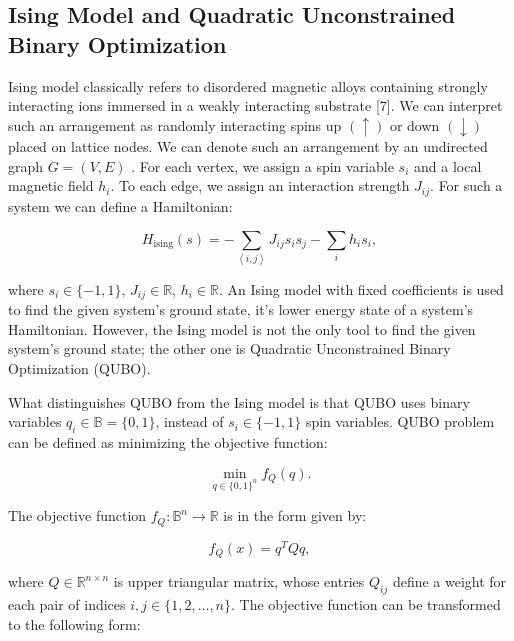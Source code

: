 \documentclass[a4paper,12pt]{article}
\begin{document}
\subsection{Ising Model and Quadratic Unconstrained Binary Optimization}\label{inig_qubo_section}

Ising model classically refers to disordered magnetic alloys containing strongly interacting ions immersed in a weakly interacting substrate [7]. We can interpret such an arrangement as randomly interacting spins up $(\uparrow)$ or down $(\downarrow)$ placed on lattice nodes. We can denote such an arrangement by an undirected graph $G=(V,E)$ \cite{Jałowiecki2023}. For each vertex, we assign a spin variable $s_i$ and a local magnetic field  $h_i$. To each edge, we assign an interaction strength $J_{ij}$. For such a system we can define a Hamiltonian:

\begin{equation}\label{isingH}
    H_{\mathrm{ising}}\left(s\right)=-\sum _{\left\langle i\right.,\left.j\right\rangle }J_{ij}s_is_j-\sum _ih_is_i,
\end{equation}

\noindent where $s_i{\in}\{-1,1\}$, $J_{ij}{\in}\mathbb{R}$, $h_i{\in}\mathbb{R}$. An Ising model with fixed coefficients is used to find the given system's ground state, it's lower energy state of a system's Hamiltonian. However, the Ising model is not the only tool to find the given system's ground state; the other one is Quadratic Unconstrained Binary Optimization (QUBO). 

What distinguishes QUBO from the Ising model is that QUBO uses binary variables $q_i{\in}\mathbb{B}=\{0,1\}$, instead of $s_i{\in}\{-1,1\}$ spin variables. QUBO problem can be defined as minimizing the objective function:

\begin{equation}
    \min_{q{\in}\{0,1\}^n}f_Q(q).
\end{equation}

\noindent The objective function $f_Q: \mathbb{B}^n \to \mathbb{R}$ is in the form given by:

\begin{equation}
    f_Q(x)=q^{T}Qq,
\end{equation}

\noindent where $Q \in \mathbb{R}^{n \times n}$ is upper triangular matrix, whose entries $Q_{ij}$ define a weight for each pair of indices $i,j \in \{1, 2, \ldots, n\}$. The objective function can be transformed to the following form:
\end{document}
